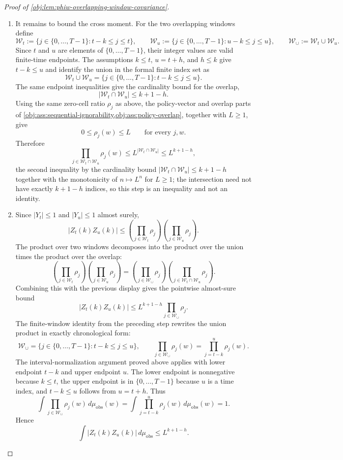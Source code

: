 \documentclass[11pt]{article}
\begin{document}
\begin{proof}[Proof of \cref{obj:lem:phiw-overlapping-window-covariance}]
\begin{enumerate}
\item It remains to bound the cross moment. For the two overlapping windows define
\[
\mathcal W_t:=\{j\in\{0,\ldots,T-1\}: t-k\le j\le t\},
\qquad
\mathcal W_u:=\{j\in\{0,\ldots,T-1\}: u-k\le j\le u\},
\qquad
\mathcal W_{\cup}:=\mathcal W_t\cup\mathcal W_u .
\]
Since \(t\) and \(u\) are elements of \(\{0,\ldots,T-1\}\), their integer values are valid finite-time endpoints. The assumptions \(k\le t\), \(u=t+h\), and \(h\le k\) give \(t-k\le u\) and identify the union in the formal finite index set as
\[
\mathcal W_t\cup\mathcal W_u
=
\{j\in\{0,\ldots,T-1\}: t-k\le j\le u\}.
\]
The same endpoint inequalities give the cardinality bound for the overlap,
\[
|\mathcal W_t\cap\mathcal W_u|\le k+1-h .
\]
Using the same zero-cell ratio \(\rho_j\) as above, the policy-vector and overlap parts of \cref{obj:ass:sequential-ignorability,obj:ass:policy-overlap}, together with \(L\ge 1\), give
\[
0\le \rho_j(w)\le L
\qquad\text{for every }j,w .
\]
Therefore
\[
\prod_{j\in\mathcal W_t\cap\mathcal W_u}\rho_j(w)
\le
L^{|\mathcal W_t\cap\mathcal W_u|}
\le
L^{k+1-h},
\]
the second inequality by the cardinality bound \(|\mathcal W_t\cap\mathcal W_u|\le k+1-h\) together with the monotonicity of \(n\mapsto L^{n}\) for \(L\ge1\); the intersection need not have exactly \(k+1-h\) indices, so this step is an inequality and not an identity.

\item Since \(|Y_t|\le 1\) and \(|Y_u|\le 1\) almost surely,
\[
|Z_t(k)Z_u(k)|
\le
\left(\prod_{j\in\mathcal W_t}\rho_j\right)
\left(\prod_{j\in\mathcal W_u}\rho_j\right).
\]
The product over two windows decomposes into the product over the union times the product over the overlap:
\[
\left(\prod_{j\in\mathcal W_t}\rho_j\right)
\left(\prod_{j\in\mathcal W_u}\rho_j\right)
=
\left(\prod_{j\in\mathcal W_{\cup}}\rho_j\right)
\left(\prod_{j\in\mathcal W_t\cap\mathcal W_u}\rho_j\right).
\]
Combining this with the previous display gives the pointwise almost-sure bound
\[
|Z_t(k)Z_u(k)|
\le
L^{k+1-h}
\prod_{j\in\mathcal W_{\cup}}\rho_j .
\]
The finite-window identity from the preceding step rewrites the union product in exactly chronological form:
\[
\mathcal W_{\cup}
=
\{j\in\{0,\ldots,T-1\}: t-k\le j\le u\},
\qquad
\prod_{j\in\mathcal W_{\cup}}\rho_j(w)
=
\prod_{j=t-k}^{u}\rho_j(w).
\]
The interval-normalization argument proved above applies with lower endpoint \(t-k\) and upper endpoint \(u\). The lower endpoint is nonnegative because \(k\le t\), the upper endpoint is in \(\{0,\ldots,T-1\}\) because \(u\) is a time index, and \(t-k\le u\) follows from \(u=t+h\). Thus
\[
\int \prod_{j\in\mathcal W_{\cup}}\rho_j(w)\,d\mu_{\mathrm{obs}}(w)
=
\int \prod_{j=t-k}^{u}\rho_j(w)\,d\mu_{\mathrm{obs}}(w)
=
1 .
\]
Hence
\[
\int |Z_t(k)Z_u(k)|\,d\mu_{\mathrm{obs}}
\le
L^{k+1-h}.
\]


\end{enumerate}
\end{proof}
\end{document}
